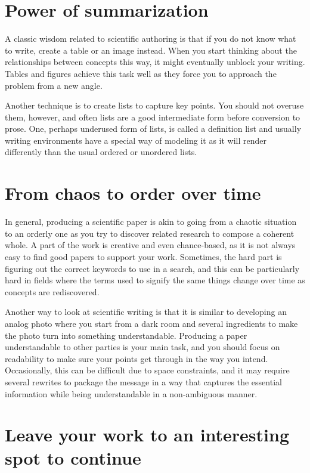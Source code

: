 \section{Power of summarization}

A classic wisdom related to scientific authoring is that if you do not know what to write, create a table or an image instead.
When you start thinking about the relationships between concepts this way, it might eventually unblock your writing.
Tables and figures achieve this task well as they force you to approach the problem from a new angle.

Another technique is to create lists to capture key points.
You should not overuse them, however, and often lists are a good intermediate form before conversion to prose.
One, perhaps underused form of lists, is called a definition list and usually writing environments have a special way of modeling it as it will render differently than the usual ordered or unordered lists.

\section{From chaos to order over time}

In general, producing a scientific paper is akin to going from a chaotic situation to an orderly one as you try to discover related research to compose a coherent whole.
A part of the work is creative and even chance-based, as it is not always easy to find good papers to support your work.
Sometimes, the hard part is figuring out the correct keywords to use in a search, and this can be particularly hard in fields where the terms used to signify the same things change over time as concepts are rediscovered.

Another way to look at scientific writing is that it is similar to developing an analog photo where you start from a dark room and several ingredients to make the photo turn into something understandable.
Producing a paper understandable to other parties is your main task, and you should focus on readability to make sure your points get through in the way you intend.
Occasionally, this can be difficult due to space constraints, and it may require several rewrites to package the message in a way that captures the essential information while being understandable in a non-ambiguous manner.

\section{Leave your work to an interesting spot to continue}

